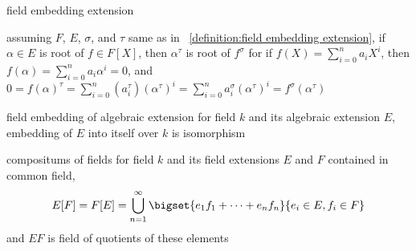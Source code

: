 \documentclass[17pt,landscape]{foils}
\newcommand\diagtriruu[6]{%
\begin{array}{lcr}%
{#1}& \overset{#2}{\longrightarrow} &{#3}%
\\%
{}_{#6}\nwarrow&&\nearrow{}_{#4}%
\\%
&{#5}&%
\end{array}%
}
\newcommand\diagsquare[8]{%
\begin{array}{rccl}%
{#1}&\overset{#2}{\longrightarrow}&{#3}\ \ \ \ %
\\%
{}_{#8}\uparrow&&\uparrow{}_{#4}%
\\%
{#7}&\underset{#6}{\longrightarrow}&{#5}\ \ \ \ %
\end{array}%
}
\begin{document}
{\begin{mydefinition}{field embedding extension}
\end{mydefinition}

\vfill
\begin{figure}
\begin{center}
	\embeddingextensionf{4em}
	\hspace{3cm}
	\embeddingextensiont{4.6188em}
\end{center}
\label{fig:field embedding extensions}
\end{figure}


\shrinkspacewithintheoremslike
\bit
\item
	assuming $F$, $E$, $\sigma$, and $\tau$ same as in ~\ref{definition:field embedding extension},
	if $\alpha\in E$ is root of $f\in F[X]$, then $\alpha^\tau$ is root of $f^\sigma$
	for
		 if $f(X) = \sum_{i=0}^n a_i X^i$, then $f(\alpha) = \sum_{i=0}^n a_i \alpha^i = 0$,
		 and
		$
		 	0
			= f(\alpha)^\tau
			= \sum_{i=0}^n (a_i^\tau ) (\alpha^\tau)^i
			= \sum_{i=0}^n a_i^\sigma (\alpha^\tau)^i
			= f^\sigma(\alpha^\tau)
		$
\eit



\begin{mylemma}{field embedding of algebraic extension}%
	for field $k$ and its algebraic extension $E$,
	embedding of $E$ into itself over $k$
	is isomorphism
\end{mylemma}

\vfill
\begin{mylemma}{compositums of fields}%
	for field $k$ and its field extensions $E$ and $F$ contained in common field,
	$$
		E[F] = F[E] = \bigcup_{n=1}^\infty \bigset{e_1f_1 + \cdots + e_nf_n}{e_i\in E, f_i\in F}
	$$
	and
	$EF$ is field of quotients of these elements
\end{mylemma}

}
\end{document}
